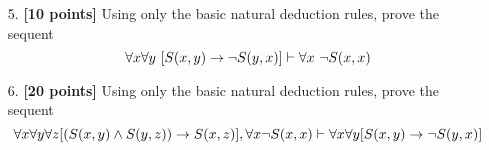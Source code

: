 \documentclass{article}
\begin{document}
\begin{enumerate}
\item[5.] \textbf{[10 points]} Using only the basic natural deduction
  rules, prove the sequent
  \begin{displaymath}
    \forall x \forall y\ [S(x,y) \rightarrow \neg S(y,x)]
    \vdash
    \forall x\ \neg S(x,x)
  \end{displaymath}
\end{enumerate}

\begin{enumerate}
\item[6.] \textbf{[20 points]} Using only the basic natural deduction
  rules, prove the sequent
  \begin{displaymath}
    \forall x \forall y \forall z [(S(x,y) \land S(y,z)) \rightarrow
    S(x,z)],
    \forall x \neg S(x,x)
    \vdash
    \forall x \forall y [S(x,y) \rightarrow \neg S(y,x)]
  \end{displaymath}
\end{enumerate}
\end{document}
